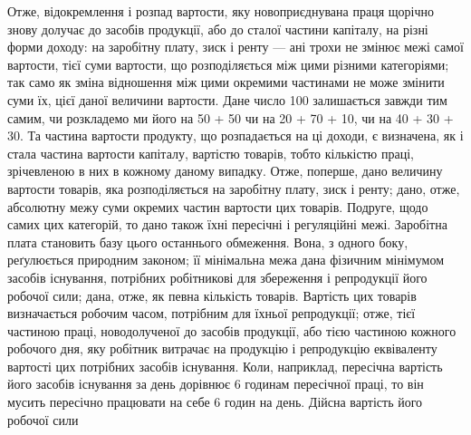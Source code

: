 Отже, відокремлення і розпад вартости, яку новоприєднувана праця щорічно
знову долучає до засобів продукції, або до сталої частини капіталу, на різні форми
доходу: на заробітну плату, зиск і ренту — ані трохи не змінює межі самої вартости,
тієї суми вартости, що розподіляється між цими різними категоріями; так
само як зміна відношення між цими окремими частинами не може змінити суми їх,
цієї даної величини вартости. Дане число 100 залишається завжди тим самим, чи
розкладемо ми його на 50 + 50 чи на 20 + 70 + 10, чи на 40 + 30 + 30. Та
частина вартости продукту, що розпадається на ці доходи, є визначена, як і стала
частина вартости капіталу, вартістю товарів, тобто кількістю праці, зрічевленою
в них в кожному даному випадку. Отже, поперше, дано величину вартости
товарів, яка розподіляється на заробітну плату, зиск і ренту; дано, отже, абсолютну
межу суми окремих частин вартости цих товарів. Подруге, щодо самих
цих категорій, то дано також їхні пересічні і регуляційні межі. Заробітна плата
становить базу цього останнього обмеження. Вона, з одного боку, реґулюється
природним законом; її мінімальна межа дана фізичним мінімумом засобів існування,
потрібних робітникові для збереження і репродукції його робочої сили;
дана, отже, як певна кількість товарів. Вартість цих товарів визначається робочим
часом, потрібним для їхньої репродукції; отже, тієї частиною праці, новодолученої
до засобів продукції, або тією частиною кожного робочого дня, яку
робітник витрачає на продукцію і репродукцію еквіваленту вартості цих потрібних
засобів існування. Коли, наприклад, пересічна вартість його засобів
існування за день дорівнює 6 годинам пересічної праці, то він мусить пересічно
працювати на себе 6 годин на день. Дійсна вартість його робочої сили

